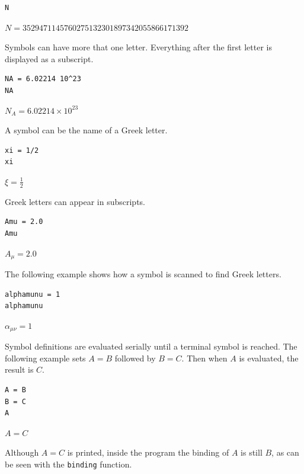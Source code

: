\documentclass[12pt]{article}
\begin{document}
{\color{blue}
\begin{verbatim}
N
\end{verbatim}
}

$\displaystyle N=3529471145760275132301897342055866171392$

\bigskip

Symbols can have more that one letter.
Everything after the first letter is displayed as a subscript.

{\color{blue}
\begin{verbatim}
NA = 6.02214 10^23
NA
\end{verbatim}
}

$\displaystyle N_A=6.02214\times10^{23}$

\bigskip

A symbol can be the name of a Greek letter.

{\color{blue}
\begin{verbatim}
xi = 1/2
xi
\end{verbatim}
}

$\displaystyle \xi=\tfrac{1}{2}$

\bigskip

Greek letters can appear in subscripts.

{\color{blue}
\begin{verbatim}
Amu = 2.0
Amu
\end{verbatim}
}

$\displaystyle A_\mu=2.0$

\bigskip

The following example shows how a symbol is scanned to find Greek letters.

{\color{blue}
\begin{verbatim}
alphamunu = 1
alphamunu
\end{verbatim}
}

$\displaystyle \alpha_{\mu\nu}=1$

\bigskip

Symbol definitions are evaluated serially until a terminal symbol is reached.
The following example sets $A=B$ followed by $B=C$.
Then when $A$ is evaluated, the result is $C$.

{\color{blue}
\begin{verbatim}
A = B
B = C
A
\end{verbatim}
}

$\displaystyle A=C$

\bigskip

Although $A=C$ is printed,
inside the program the binding of $A$ is still $B$, as can be seen with
the \verb$binding$ function.
\end{document}
